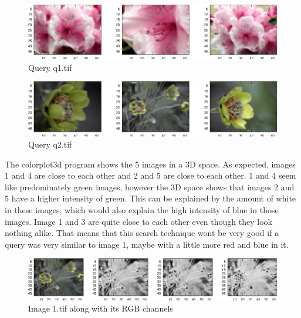 \documentclass[10pt, a4paper]{article}
\begin{document}
\begin{figure}[h!]
  \centering
  \includegraphics{../data/0.eps}
  \caption{Query q1.tif}
  \label{fig:q1}
\end{figure}

\begin{figure}[h!]
  \centering
  \includegraphics{../data/1.eps}
  \caption{Query q2.tif}
  \label{fig:q2}
\end{figure}

The colorplot3d program shows the 5 images in a 3D space. As expected, images 1 and 4 are close to each other
and 2 and 5 are close to each other. 1 and 4 seem like predominately green images, however the 3D space shows
that images 2 and 5 have a higher intensity of green. This can be explained by the amount of white in these 
images, which would also explain the high intensity of blue in those images. Image 1 and 3 are quite close to
each other even though they look nothing alike. That means that this search technique wont be very good if a
query was very similar to image 1, maybe with a little more red and blue in it. 

\begin{figure}[h!]
  \centering
  \includegraphics{../data/c0.eps}
  \caption{Image 1.tif along with its RGB channels}
  \label{fig:rgb}
\end{figure}

\pagebreak
\end{document}

